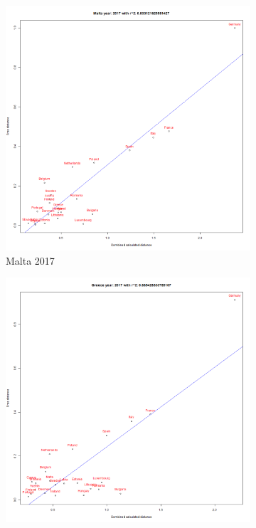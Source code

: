 \documentclass[a4paper,twoside,10pt]{article}
\begin{document}
	\begin{figure}[H]
		\centering
		\begin{subfigure}[b]{0.3\textwidth}
			\centering
			\includegraphics[width=\textwidth]{images/Malta 2017.png}
			\caption{Malta 2017}
			\label{fig:Malta_2017}
		\end{subfigure}
		\hfill
		\begin{subfigure}[b]{0.3\textwidth}
			\centering
			\includegraphics[width=\textwidth]{images/Greece 2017.png}

\end{subfigure}
\end{figure}
\end{document}
